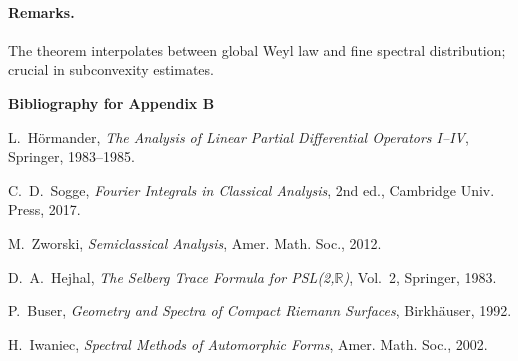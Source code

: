 \paragraph{Remarks.}
The theorem interpolates between global Weyl law and fine spectral
distribution; crucial in subconvexity estimates.

%

%
\bigskip
\noindent \textbf{Bibliography for Appendix B}
\begin{thebibliography}{10}

L.~Hörmander,
\emph{The Analysis of Linear Partial Differential Operators I–IV},
Springer, 1983–1985.

C.~D.~Sogge,
\emph{Fourier Integrals in Classical Analysis}, 2nd ed.,
Cambridge Univ. Press, 2017.

M.~Zworski,
\emph{Semiclassical Analysis}, Amer. Math. Soc., 2012.

D.~A.~Hejhal,
\emph{The Selberg Trace Formula for PSL(2,$\mathbb R$)}, Vol.~2,
Springer, 1983.

P.~Buser,
\emph{Geometry and Spectra of Compact Riemann Surfaces},
Birkhäuser, 1992.

H.~Iwaniec,
\emph{Spectral Methods of Automorphic Forms},
Amer. Math. Soc., 2002.

\end{thebibliography}
%

%
